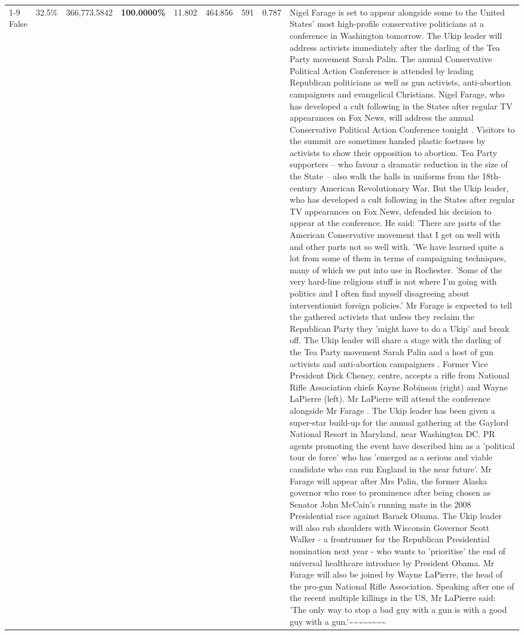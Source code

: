 \begin{table}[H]
\begin{tabular}{lllrlllll}
\cline{1-9}
False & 32.5\% & 366,773.5842 & \bfseries \color{red} 100.0000\% & 11.802 & 464.856 & 591 & 0.787 & Nigel Farage is set to appear alongside some to the United States' most high-profile conservative politicians at a conference in Washington tomorrow. The Ukip leader will address activists immediately after the darling of the Tea Party movement Sarah Palin. The annual Conservative Political Action Conference is attended by leading Republican politicians as well as gun activists, anti-abortion campaigners and evangelical Christians. Nigel Farage, who has developed a cult following in the States after regular TV appearances on Fox News, will address the annual Conservative Political Action Conference tonight . Visitors to the summit are sometimes handed plastic foetuses by activists to show their opposition to abortion. Tea Party supporters – who favour a dramatic reduction in the size of the State – also walk the halls in uniforms from the 18th-century American Revolutionary War. But the Ukip leader, who has developed a cult following in the States after regular TV appearances on Fox News, defended his decision to appear at the conference. He said: 'There are parts of the American Conservative movement that I get on well with and other parts not so well with. 'We have learned quite a lot from some of them in terms of campaigning techniques, many of which we put into use in Rochester. 'Some of the very hard-line religious stuff is not where I'm going with politics and I often find myself disagreeing about interventionist foreign policies.' Mr Farage is expected to tell the gathered activists that unless they reclaim the Republican Party they 'might have to do a Ukip' and break off. The Ukip leader will share a stage with the darling of the Tea Party movement Sarah Palin and a host of gun activists and anti-abortion campaigners . Former Vice President Dick Cheney, centre, accepts a rifle from National Rifle Association chiefs Kayne Robinson (right) and Wayne LaPierre (left). Mr LaPierre will attend the conference alongside Mr Farage . The Ukip leader has been given a super-star build-up for the annual gathering at the Gaylord National Resort in Maryland, near Washington DC. PR agents promoting the event have described him as a 'political tour de force' who has 'emerged as a serious and viable candidate who can run England in the near future'. Mr Farage will appear after Mrs Palin, the former Alaska governor who rose to prominence after being chosen as Senator John McCain's running mate in the 2008 Presidential race against Barack Obama. The Ukip leader will also rub shoulders with Wisconsin Governor Scott Walker - a frontrunner for the Republican Presidential nomination next year - who wants to 'prioritise' the end of universal healthcare introduce by President Obama. Mr Farage will also be joined by Wayne LaPierre, the head of the pro-gun National Rifle Association. Speaking after one of the recent multiple killings in the US, Mr LaPierre said: 'The only way to stop a bad guy with a gun is with a good guy with a gun.'\textasciitilde \textasciitilde \textasciitilde \textasciitilde \textasciitilde \textasciitilde \textasciitilde \textasciitilde  \\

\end{tabular}
\end{table}
